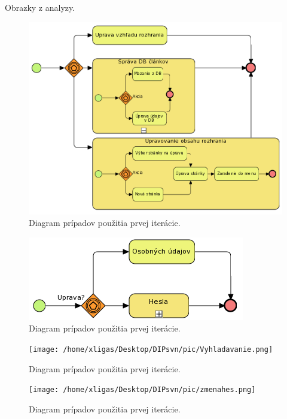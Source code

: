 Obrazky z analyzy.

\begin{figure}[ht]
 \centering
 \includegraphics[width=\linewidth]{pic/spravacas.png}
  \caption{Diagram prípadov použitia prvej iterácie.}
 \label{fig:uc2}
\end{figure}

\begin{figure}[ht]
 \centering
 \includegraphics{pic/upravaprof.png}
  \caption{Diagram prípadov použitia prvej iterácie.}
 \label{fig:uc2}
\end{figure}

\begin{figure}[ht]
 \centering
 \texttt{[image: /home/xligas/Desktop/DIPsvn/pic/Vyhladavanie.png]}
  \caption{Diagram prípadov použitia prvej iterácie.}
 \label{fig:uc2}
\end{figure}

\begin{figure}[ht]
 \centering
 \texttt{[image: /home/xligas/Desktop/DIPsvn/pic/zmenahes.png]}
  \caption{Diagram prípadov použitia prvej iterácie.}
 \label{fig:uc2}
\end{figure}

